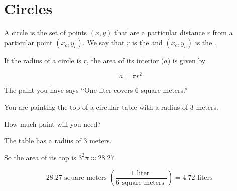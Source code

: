 \chapter{Circles}

A circle is the set of points $(x, y)$ that are a particular distance $r$ from a
particular point $(x_c, y_c)$.  We say that $r$ is the
 and $(x_c, y_c)$ is the .

\begin{center}
\end{center}


\begin{mdframed}[style=important, frametitle={Area and Radius}]

  If the radius of a circle is $r$, the area of its interior ($a$) is given 
  by 

  $$a = \pi r^2$$

\end{mdframed}

\begin{Exercise}[title={Area of a Circle}, label=area_of_circle]

  The paint you have says ``One liter covers 6 square meters.''

  You are painting the top of a circular table with a radius of 3 meters.

  How much paint will you need?
  
\end{Exercise}
\begin{Answer}[ref=area_of_circle]

  The table has a radius of 3 meters.

  So the area of its top is $3^2 \pi \approx 28.27$.

  $$ 28.27 \text{ square meters }\left(\frac{1 \text{ liter }}{6 \text{ square 
  meters }} \right) = 4.72 \text{ liters }$$ 
  
\end{Answer}


